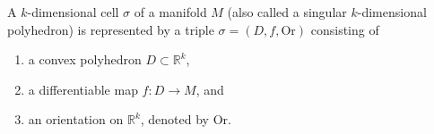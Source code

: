 A $k$-dimensional cell $\sigma$ of a manifold $M$ (also called a singular $k$-dimensional polyhedron) is represented by a triple $\sigma = (D, f, \text{Or})$ consisting of
\begin{enumerate}
\item a convex polyhedron $D \subset \mathbb{R}^k$,
\item a differentiable map $f: D \to M$, and
\item an orientation on $\mathbb{R}^k$, denoted by Or.
\end{enumerate}
